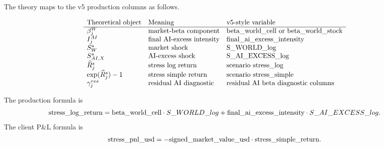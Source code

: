 \documentclass[11pt]{article}
\begin{document}
The theory maps to the v5 production columns as follows.

\[
\begin{array}{lll}
\hbox{Theoretical object} & \hbox{Meaning} & \hbox{v5-style variable}\\
\hline
\beta_j^W & \hbox{market-beta component} & \hbox{beta\_world\_cell or beta\_world\_stock}\\
I_j^{AI} & \hbox{final AI-excess intensity} & \hbox{final\_ai\_excess\_intensity}\\
S_W^s & \hbox{market shock} & \hbox{S\_WORLD\_log}\\
S_{AI,X}^s & \hbox{AI-excess shock} & \hbox{S\_AI\_EXCESS\_log}\\
\widehat R_j^s & \hbox{stress log return} & \hbox{scenario stress\_log}\\
\exp(\widehat R_j^s)-1 & \hbox{stress simple return} & \hbox{scenario stress\_simple}\\
\gamma_j^{res} & \hbox{residual AI diagnostic} & \hbox{residual AI beta diagnostic columns}
\end{array}
\]

The production formula is
\[
\hbox{stress\_log\_return}
=
\hbox{beta\_world\_cell}\cdot S\_WORLD\_log
+
\hbox{final\_ai\_excess\_intensity}\cdot S\_AI\_EXCESS\_log.
\]
The client P\&L formula is
\[
\hbox{stress\_pnl\_usd}
=-\hbox{signed\_market\_value\_usd}\cdot \hbox{stress\_simple\_return}.
\]
\end{document}
